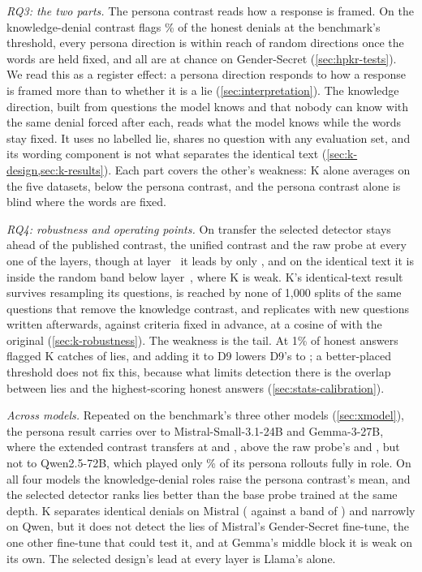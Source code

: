 \emph{RQ3: the two parts.} The persona contrast reads how a response is framed. On \hpkr{} the
knowledge-denial contrast flags \% of the honest denials at the
benchmark's threshold, every persona direction is within reach of random directions once the words are
held fixed, and all are at chance on Gender-Secret (\cref{sec:hpkr-tests}). We read this as a register
effect: a persona direction responds to how a response is framed more than to whether it is a lie
(\cref{sec:interpretation}). The knowledge direction, built from  questions the model
knows and  that nobody can know with the same denial forced after each, reads what the
model knows while the words stay fixed. It uses no labelled lie, shares no question with any evaluation
set, and its wording component is not what separates the identical text
(\cref{sec:k-design,sec:k-results}). Each part covers the other's weakness: K alone averages
 on the five datasets, below the persona contrast, and the persona contrast alone is
blind where the words are fixed.

\emph{RQ4: robustness and operating points.} On transfer the selected detector stays ahead of the
published contrast, the unified contrast and the raw probe at every one of the  layers,
though at layer~ it leads by only , and
on the identical text it is inside the random band below layer~,
where K is weak. K's identical-text result survives resampling its questions, is reached by none of
1,000 splits of the same questions that remove the knowledge contrast, and replicates with new
questions written afterwards, against criteria fixed in advance, at a cosine of 
with the original (\cref{sec:k-robustness}). The weakness is the tail. At 1\% of honest answers flagged
K catches  of lies, and adding it to D9 lowers D9's  to
; a better-placed threshold does not fix this, because what limits detection
there is the overlap between lies and the highest-scoring honest answers (\cref{sec:stats-calibration}).

\emph{Across models.} Repeated on the benchmark's three other models (\cref{sec:xmodel}), the persona
result carries over to Mistral-Small-3.1-24B and Gemma-3-27B, where the extended contrast transfers at
 and , above the raw probe's  and
, but not to Qwen2.5-72B, which played only \% of its persona
rollouts fully in role. On all four models the knowledge-denial roles raise the persona contrast's mean,
and the selected detector ranks lies better than the base probe trained at the same depth. K separates
identical denials on Mistral ( against a band of ) and
narrowly on Qwen, but it does not detect the lies of Mistral's Gender-Secret fine-tune, the one other
fine-tune that could test it, and at Gemma's middle block it is weak on its own. The selected design's
lead at every layer is Llama's alone.

